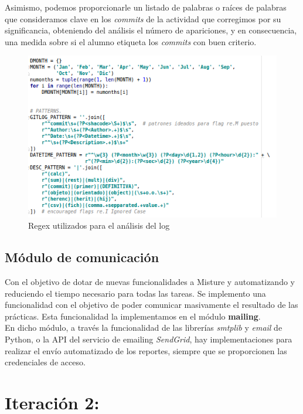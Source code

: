 Asimismo, podemos proporcionarle un listado de palabras o raíces de palabras que consideramos clave en los \textit{commits} de la actividad que corregimos por su significancia, obteniendo  del análisis el número de apariciones, y en consecuencia, una medida sobre si el alumno etiqueta los \textit{commits} con buen criterio.


\begin{figure}[H]
   \centering
   \includegraphics[width=16cm]{img/Selection_025_gitlog_patterns}
   \caption{Regex utilizados para el análisis del log}
   \label{figura:reg_analisis_log}
\end{figure}

\subsection{Módulo de comunicación}

Con el objetivo de dotar de nuevas funcionalidades a Misture y automatizando y reduciendo el tiempo necesario para todas las tareas. Se implemento una funcionalidad con el objetivo de poder comunicar masivamente el resultado de las prácticas. Esta funcionalidad la implementamos en el módulo \textbf{mailing}.\\

En dicho módulo, a través la funcionalidad de las librerías \textit{smtplib} y \textit{email} de Python, o la API del servicio de emailing \textit{SendGrid}, hay implementaciones para realizar el envío automatizado de los reportes, siempre que se proporcionen las credenciales de acceso.


\section{Iteración 2:} 
\label{subsec:iteracion2}

